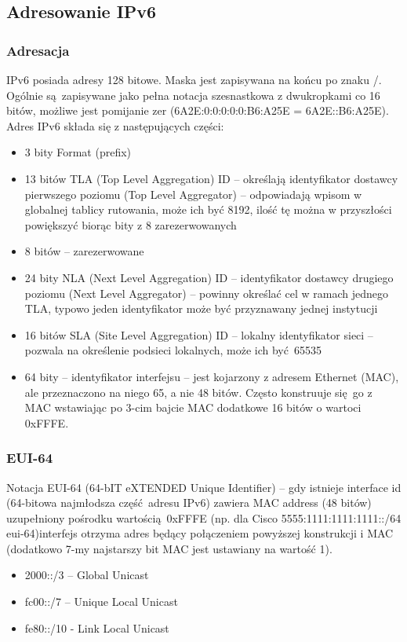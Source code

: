 \documentclass[a4paper, 12pt, titlepage]{article}
\begin{document}
		\subsection{Adresowanie IPv6}
			\subsubsection{Adresacja}
				IPv6 posiada adresy 128 bitowe. Maska jest zapisywana na końcu po znaku /. Ogólnie są zapisywane jako pełna notacja szesnastkowa z dwukropkami co 16 bitów, możliwe jest pomijanie zer (6A2E:0:0:0:0:0:B6:A25E = 6A2E::B6:A25E).
				\newline\newline
				Adres IPv6 składa się z następujących części:
				\begin{itemize}
					\item 3 bity Format (prefix)
					\item 13 bitów TLA (Top Level Aggregation) ID -- określają identyfikator dostawcy pierwszego poziomu (Top Level Aggregator) -- odpowiadają wpisom w globalnej tablicy rutowania, może ich być 8192, ilość tę można w przyszłości powiększyć biorąc bity z 8 zarezerwowanych
					\item 8 bitów -- zarezerwowane
					\item 24 bity NLA (Next Level Aggregation) ID -- identyfikator dostawcy drugiego poziomu (Next Level Aggregator) -- powinny określać cel w ramach jednego TLA, typowo jeden identyfikator może być przyznawany jednej instytucji
					\item 16 bitów SLA (Site Level Aggregation) ID -- lokalny identyfikator sieci -- pozwala na określenie podsieci lokalnych, może ich być 65535
					\item 64 bity -- identyfikator interfejsu -- jest kojarzony z adresem Ethernet (MAC), ale przeznaczono na niego 65, a nie 48 bitów. Często konstruuje się go z MAC wstawiając po 3-cim bajcie MAC dodatkowe 16 bitów o wartoci 0xFFFE.
				\end{itemize}
			\subsubsection{EUI-64}
				Notacja EUI-64 (64-bIT eXTENDED Unique Identifier) -- gdy istnieje interface id (64-bitowa najmłodsza część adresu IPv6) zawiera MAC address (48 bitów) uzupełniony pośrodku wartością 0xFFFE (np. dla Cisco 5555:1111:1111:1111::/64 eui-64)interfejs otrzyma adres będący połączeniem powyższej konstrukcji i MAC (dodatkowo 7-my najstarszy bit MAC jest ustawiany na wartość 1).
				\begin{itemize}
					\item 2000::/3 -- Global Unicast
					\item fc00::/7 -- Unique Local Unicast
					\item fe80::/10 - Link Local Unicast
				\end{itemize}
\end{document}
